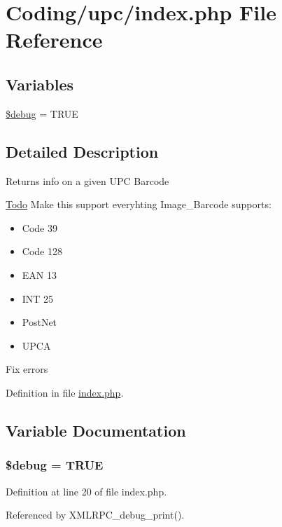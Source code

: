 \hypertarget{index_8php}{
\section{Coding/upc/index.php File Reference}
\label{index_8php}
}
\subsection*{Variables}
\begin{CompactItemize}
\item 
\hyperlink{index_8php_85ae3e64cd40e9564adceb010085e9dd}{\$debug} = TRUE
\end{CompactItemize}


\subsection{Detailed Description}
Returns info on a given UPC Barcode \begin{Desc}
\item[\hyperlink{todo__todo000001}{Todo}]Make this support everyhting Image\_\-Barcode supports:\begin{itemize}
\item Code 39\item Code 128\item EAN 13\item INT 25\item PostNet\item UPCA \end{itemize}


Fix errors \end{Desc}


Definition in file \hyperlink{index_8php-source}{index.php}.

\subsection{Variable Documentation}
\hypertarget{index_8php_85ae3e64cd40e9564adceb010085e9dd}{
\subsubsection{\setlength{\rightskip}{0pt plus 5cm}\$debug = TRUE}}
\label{index_8php_85ae3e64cd40e9564adceb010085e9dd}




Definition at line 20 of file index.php.

Referenced by XMLRPC\_\-debug\_\-print().